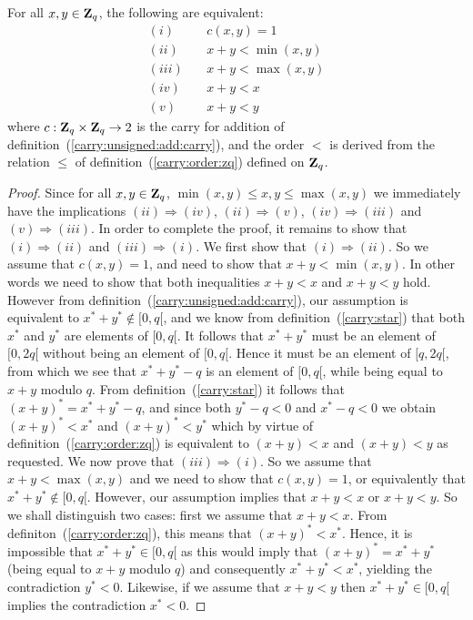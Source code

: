 \documentclass{article}
\newcommand{\zq}{\mbox{${\bf Z}_{q}$}}
\begin{document}
\begin{prop}\label{carry:unsigned:add:criterium}
  For all $x,y\in\zq$, the following are equivalent:
    \begin{eqnarray*}
      (i)&\ &c(x,y) = 1\\
      (ii)&\ & x + y < \min(x,y)\\
      (iii)&\ & x + y < \max(x,y)\\
      (iv)&\ & x + y < x\\
      (v) &\ & x + y < y
    \end{eqnarray*}
where $c:\zq\times\zq\rightarrow 2$ is the carry for addition of 
  definition~(\ref{carry:unsigned:add:carry}), and the order $<$
  is derived from the relation $\leq$ of 
  definition~(\ref{carry:order:zq}) defined on \zq.
\end{prop}
\begin{proof}
  Since for all $x,y\in\zq$, $\min(x,y)\leq x, y\leq\max(x,y)$ we immediately 
  have the implications $(ii)\Rightarrow(iv)$, $(ii)\Rightarrow(v)$, 
  $(iv)\Rightarrow(iii)$ and $(v)\Rightarrow(iii)$. In order to complete
  the proof, it remains to show that $(i)\Rightarrow(ii)$ and 
  $(iii)\Rightarrow(i)$. We first show that $(i)\Rightarrow(ii)$. So 
  we assume that $c(x,y) = 1$, and need to show that $x+y<\min(x,y)$.
  In other words we need to show that both inequalities $x+y<x$ and 
  $x+y<y$ hold. However from definition~(\ref{carry:unsigned:add:carry}),
  our assumption is equivalent to $x^{*}+y^{*}\not\in[0,q[$, and we know
  from definition~(\ref{carry:star}) that both $x^{*}$ and $y^{*}$ are elements
  of $[0,q[$. It follows that $x^{*}+y^{*}$ must be an element of $[0,2q[$
  without being an element of $[0,q[$. Hence it must be an element of
  $[q,2q[$, from which we see that $x^{*}+y^{*}-q$ is an element of $[0,q[$,
  while being equal to $x+y$ modulo $q$. From definition~(\ref{carry:star})
  it follows that $(x+y)^{*}=x^{*}+y^{*}-q$, and since both $y^{*}-q <0$ and 
  $x^{*}-q<0$ we obtain $(x+y)^{*}<x^{*}$ and $(x+y)^{*}<y^{*}$ which by
  virtue of definition~(\ref{carry:order:zq}) is equivalent to $(x+y)<x$ and 
  $(x+y)<y$ as requested. We now prove that $(iii)\Rightarrow(i)$. So we
  assume that $x+y <\max(x,y)$ and we need to show that $c(x,y)=1$, or
  equivalently that $x^{*}+y^{*}\not\in[0,q[$. However, our assumption
  implies that $x+y<x$ or $x+y<y$. So we shall distinguish two cases:
  first we assume that $x+y<x$. From definiton~(\ref{carry:order:zq}), 
  this means that $(x+y)^{*}<x^{*}$. Hence, it is impossible that 
  $x^{*}+y^{*}\in[0,q[$ as this would imply that $(x+y)^{*}=x^{*}+y^{*}$ 
  (being equal to $x+y$ modulo $q$) and consequently $x^{*}+y^{*}<x^{*}$, 
  yielding the contradiction $y^{*}<0$. Likewise, if we assume that $x+y<y$ 
  then $x^{*}+y^{*}\in[0,q[$ implies the contradiction $x^{*}<0$.
\end{proof}
\end{document}
